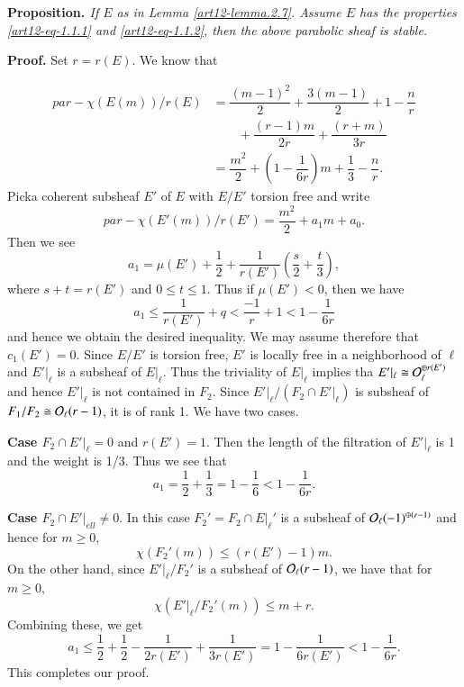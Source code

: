 \medskip
\noindent
{\bfseries {} Proposition. \label{art12-Prop.2.8}} \textit{If $E$ as in Lemma \ref{art12-lemma.2.7}. Assume $E$ has the properties \eqref{art12-eq-1.1.1} and \eqref{art12-eq-1.1.2}, then the above parabolic sheaf is stable.}

\medskip
\noindent
{\bfseries Proof.} Set $r=r(E)$. We know that

\begin{equation*}
\begin{split}
par-\chi(E(m))/r(E) &= \dfrac{(m-1)^{2}}{2} + \dfrac{3(m-1)}{2} + 1 -\dfrac{n}{r}\\
 & \qquad +\dfrac{(r-1)m}{2r} + \dfrac{(r+m)}{3r}\\
 &=\dfrac{m^{2}}{2}+ \left(1 -\dfrac{1}{6r}\right)m + \dfrac{1}{3}-\dfrac{n}{r}.
\end{split}
\end{equation*}
Pick\pageoriginale a coherent subsheaf $E'$ of $E$ with $E/E'$ torsion free and write
$$
par-\chi(E'(m))/r(E')=\dfrac{m^{2}}{2} +a_{1}m +a_{0}.
$$
Then we see
$$
a_{1} = \mu(E') + \dfrac{1}{2} + \dfrac{1}{r(E')}\left(\dfrac{s}{2} +\dfrac{t}{3}\right),
$$
where $s+t =r(E')$ and $0 \leq t \leq 1$. Thus if $\mu(E') < 0$, then we have
$$
a_{1}\leq \dfrac{1}{r(E')} + q < \dfrac{-1}{r} + 1 < 1-\dfrac{1}{6r}
$$
and hence we obtain the desired inequality. We may assume therefore that $c_{1}(E')=0$. Since $E/E'$ is torsion free, $E'$ is locally free in a neighborhood of $\ell$ and $E'|_{\ell}$ is a subsheaf of $E|_{\ell}$. Thus the triviality of $E|_{\ell}$ implies tha $E'|_{\ell} \cong\mathcal{O}_{\ell}^{\oplus r(E')}$ and hence $E'|_{\ell}$ is not contained in $F_{2}$. Since $E'|_{\ell}/(F_{2}\cap E'|_{\ell})$ is subsheaf of $F_{1}/F_{2} \cong \mathcal{O}_{\ell}(r-1)$, it is of rank 1. We have two cases.

\medskip
\noindent
{\bfseries Case  \label{art12-prop2.8-case-1}} $F_{2}\cap E'|_{\ell}=0$ and $r(E')=1$. Then the length of the filtration of $E'|_{\ell}$ is 1 and the weight is 1/3. Thus we see that
$$
a_{1}= \dfrac{1}{2} + \dfrac{1}{3} =1-\dfrac{1}{6} < 1 -\dfrac{1}{6r}.
$$

\medskip
\noindent
{\bfseries Case  \label{art12-prop2.8-case-2}} $F_{2}\cap E'|_{ell} \neq 0$. In this case $F_{2}'=F_{2}\cap E|_{\ell}'$ is a subsheaf of $\mathcal{O}_{\ell}(-1)^{\oplus (r-1)}$ and hence for $m \geq 0$,
$$
\chi(F_{2}'(m)) \leq (r(E')-1)m.
$$
On the other hand, since $E'|_{\ell}/F_{2}'$ is a subsheaf of $\mathcal{O}_{\ell}(r-1)$, we have that for $m\geq 0$,
$$
\chi(E'|_{\ell}/F_{2}'(m))\leq m +r.
$$
Combining these, we get
$$
a_{1} \leq \dfrac{1}{2} + \dfrac{1}{2} -\dfrac{1}{2r(E')} +\dfrac{1}{3r(E')}=1-\dfrac{1}{6r(E')}< 1-\dfrac{1}{6r}.
$$
This completes our proof.

